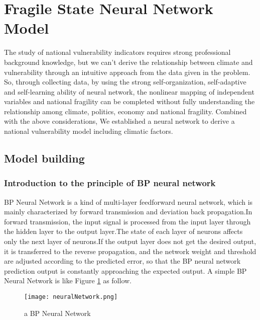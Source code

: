 \documentclass{mcmthesis}
\begin{document}





\section{Fragile State Neural Network Model}
The study of national vulnerability indicators requires strong professional
background knowledge, but we can't derive the relationship between climate
and vulnerability through an intuitive approach from the data given in the 
problem. So, through collecting data, by using the strong self-organization, 
self-adaptive and self-learning ability of neural network, the nonlinear 
mapping of independent variables and national fragility can be completed 
without fully understanding the relationship among climate, politics, 
economy and national fragility. Combined with the above considerations, 
We established a neural network to derive a national vulnerability model 
including climatic factors.
\subsection{Model building}
\subsubsection{Introduction to the principle of BP neural network}
BP Neural Network is a kind of multi-layer feedforward neural network, 
which is mainly characterized by forward transmission and deviation back 
propagation.In forward transmission, the input signal is processed from 
the input layer through the hidden layer to the output layer.The state of 
each layer of neurons affects only the next layer of neurons.If the output 
layer does not get the desired output, it is transferred to the reverse 
propagation, and the network weight and threshold are adjusted according 
to the predicted error, so that the BP neural network prediction output 
is constantly approaching the expected output. A simple BP Neural Network 
is like Figure \ref{fig:nn} as follow.
\begin{figure}[h]
\small
\centering
\texttt{[image: neuralNetwork.png]}
\caption{a BP Neural Network} 
\label{fig:nn}
\end{figure}
\end{document}
